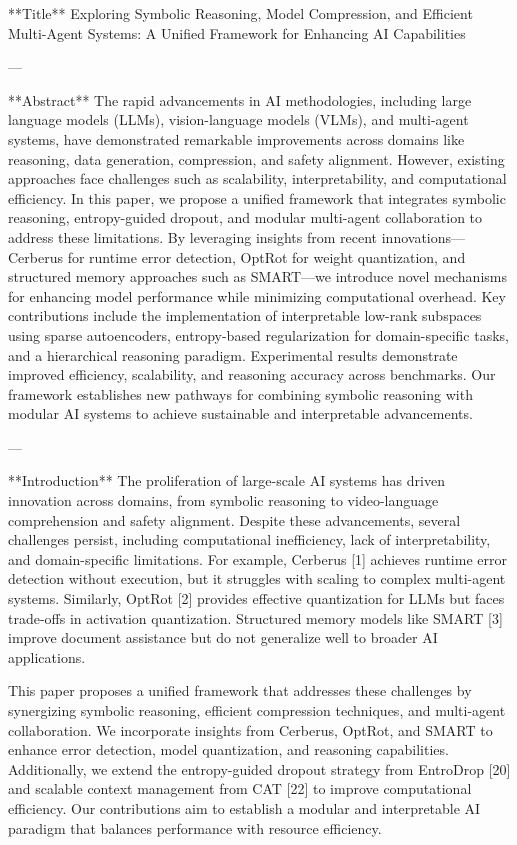 **Title**  
Exploring Symbolic Reasoning, Model Compression, and Efficient Multi-Agent Systems: A Unified Framework for Enhancing AI Capabilities  

---

**Abstract**  
The rapid advancements in AI methodologies, including large language models (LLMs), vision-language models (VLMs), and multi-agent systems, have demonstrated remarkable improvements across domains like reasoning, data generation, compression, and safety alignment. However, existing approaches face challenges such as scalability, interpretability, and computational efficiency. In this paper, we propose a unified framework that integrates symbolic reasoning, entropy-guided dropout, and modular multi-agent collaboration to address these limitations. By leveraging insights from recent innovations—Cerberus for runtime error detection, OptRot for weight quantization, and structured memory approaches such as SMART—we introduce novel mechanisms for enhancing model performance while minimizing computational overhead. Key contributions include the implementation of interpretable low-rank subspaces using sparse autoencoders, entropy-based regularization for domain-specific tasks, and a hierarchical reasoning paradigm. Experimental results demonstrate improved efficiency, scalability, and reasoning accuracy across benchmarks. Our framework establishes new pathways for combining symbolic reasoning with modular AI systems to achieve sustainable and interpretable advancements.  

---

**Introduction**  
The proliferation of large-scale AI systems has driven innovation across domains, from symbolic reasoning to video-language comprehension and safety alignment. Despite these advancements, several challenges persist, including computational inefficiency, lack of interpretability, and domain-specific limitations. For example, Cerberus [1] achieves runtime error detection without execution, but it struggles with scaling to complex multi-agent systems. Similarly, OptRot [2] provides effective quantization for LLMs but faces trade-offs in activation quantization. Structured memory models like SMART [3] improve document assistance but do not generalize well to broader AI applications.  

This paper proposes a unified framework that addresses these challenges by synergizing symbolic reasoning, efficient compression techniques, and multi-agent collaboration. We incorporate insights from Cerberus, OptRot, and SMART to enhance error detection, model quantization, and reasoning capabilities. Additionally, we extend the entropy-guided dropout strategy from EntroDrop [20] and scalable context management from CAT [22] to improve computational efficiency. Our contributions aim to establish a modular and interpretable AI paradigm that balances performance with resource efficiency.  

